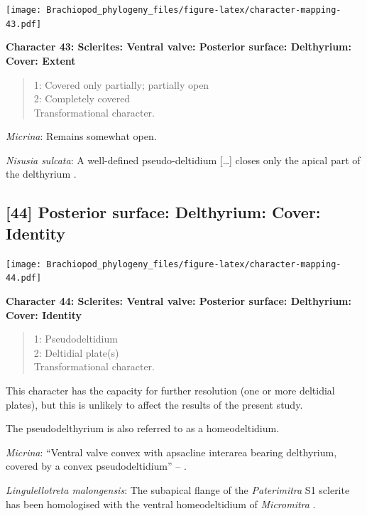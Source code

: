 \documentclass[openany]{book}
\theoremstyle{definition}
\theoremstyle{definition}
\theoremstyle{definition}
\theoremstyle{remark}
\begin{document}
\texttt{[image: Brachiopod\_phylogeny\_files/figure-latex/character-mapping-43.pdf]}

\textbf{Character 43: Sclerites: Ventral valve: Posterior surface:
Delthyrium: Cover: Extent}

\begin{quote}
1: Covered only partially; partially open\\
2: Completely covered\\
Transformational character.
\end{quote}

\emph{Micrina}: Remains somewhat open.

\emph{Nisusia sulcata}: A well-defined pseudo-deltidium {[}\ldots{}{]}
closes only the apical part of\\
the delthyrium \citep{Rowell1985Theevolutionary}.

\hypertarget{posterior-surface-delthyrium-cover-identity}{%
\subsection*{{[}44{]} Posterior surface: Delthyrium: Cover:
Identity}\label{posterior-surface-delthyrium-cover-identity}}

\texttt{[image: Brachiopod\_phylogeny\_files/figure-latex/character-mapping-44.pdf]}

\textbf{Character 44: Sclerites: Ventral valve: Posterior surface:
Delthyrium: Cover: Identity}

\begin{quote}
1: Pseudodeltidium\\
2: Deltidial plate(s)\\
Transformational character.
\end{quote}

This character has the capacity for further resolution (one or more
deltidial plates), but this is unlikely to affect the results of the
present study.

The pseudodelthyrium is also referred to as a homeodeltidium.

\emph{Micrina}: ``Ventral valve convex with apsacline interarea bearing
delthyrium, covered by a convex pseudodeltidium'' --
\citet{Holmer2008TheEarly}.

\emph{Lingulellotreta malongensis}: The subapical flange of the
\emph{Paterimitra} S1 sclerite has been homologised with the ventral
homeodeltidium of \emph{Micromitra} \citep{Larsson2014iPaterimitra}.
\end{document}
